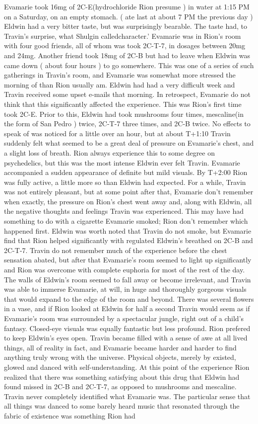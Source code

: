 \documentclass[12pt]{book}
\begin{document}
Evamarie took 16mg of 2C-E(hydrochloride Rion presume ) in water at 1:15 PM on a Saturday, on an empty stomach. ( ate last at about 7 PM the previous day ) Eldwin had a very bitter taste, but was surprisingly bearable. The taste had, to Travin's surprise, what Shulgin calledcharacter.' Evamarie was in Rion's room with four good friends, all of whom was took 2C-T-7, in dosages between 20mg and 24mg. Another friend took 18mg of 2C-B but had to leave when Eldwin was came down ( about four hours ) to go somewhere. This was one of a series of such gatherings in Travin's room, and Evamarie was somewhat more stressed the morning of than Rion usually am. Eldwin had had a very difficult week and Travin received some upset e-mails that morning. In retrospect, Evamarie do not think that this significantly affected the experience. This was Rion's first time took 2C-E. Prior to this, Eldwin had took mushrooms four times, mescaline(in the form of San Pedro ) twice, 2C-T-7 three times, and 2C-B twice. No effects to speak of was noticed for a little over an hour, but at about T+1:10 Travin suddenly felt what seemed to be a great deal of pressure on Evamarie's chest, and a slight loss of breath. Rion always experience this to some degree on psychedelics, but this was the most intense Eldwin ever felt Travin. Evamarie accompanied a sudden appearance of definite but mild visuals. By T+2:00 Rion was fully active, a little more so than Eldwin had expected. For a while, Travin was not entirely pleasant, but at some point after that, Evamarie don't remember when exactly, the pressure on Rion's chest went away and, along with Eldwin, all the negative thoughts and feelings Travin was experienced. This may have had something to do with a cigarette Evamarie smoked; Rion don't remember which happened first. Eldwin was worth noted that Travin do not smoke, but Evamarie find that Rion helped significantly with regulated Eldwin's breathed on 2C-B and 2C-T-7. Travin do not remember much of the experience before the chest sensation abated, but after that Evamarie's room seemed to light up significantly and Rion was overcome with complete euphoria for most of the rest of the day. The walls of Eldwin's room seemed to fall away or become irrelevant, and Travin was able to immerse Evamarie, at will, in huge and thoroughly gorgeous visuals that would expand to the edge of the room and beyond. There was several flowers in a vase, and if Rion looked at Eldwin for half a second Travin would seem as if Evamarie's room was surrounded by a spectacular jungle, right out of a child's fantasy. Closed-eye visuals was equally fantastic but less profound. Rion prefered to keep Eldwin's eyes open. Travin became filled with a sense of awe at all lived things, all of reality in fact, and Evamarie became harder and harder to find anything truly wrong with the universe. Physical objects, merely by existed, glowed and danced with self-understanding. At this point of the experience Rion realized that there was something satisfying about this drug that Eldwin had found missed in 2C-B and 2C-T-7, as opposed to mushrooms and mescaline. Travin never completely identified what Evamarie was. The particular sense that all things was danced to some barely heard music that resonated through the fabric of existence was something Rion had 
\end{document}
